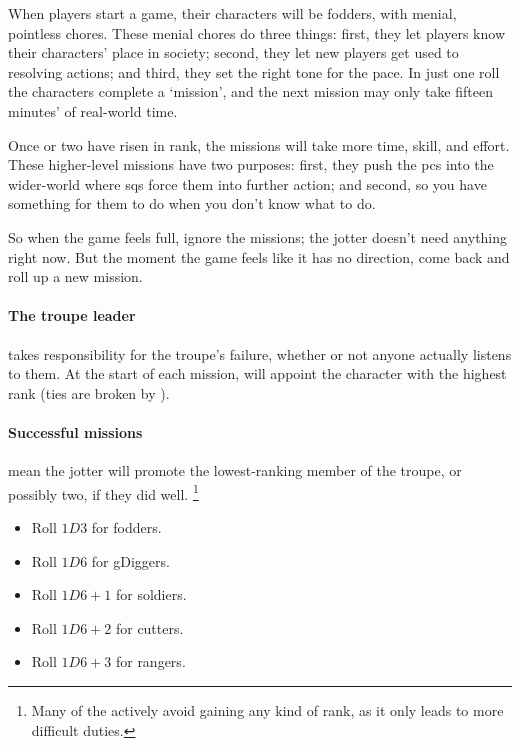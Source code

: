 \begin{multicols}{2}

\noindent
When players start a game, their characters will be \glspl{fodder}, with menial, pointless chores.
These menial chores do three things: first, they let players know their characters' place in society; second, they let new players get used to resolving actions; and third, they set the right tone for the pace.
In just one roll the characters complete a `mission', and the next mission may only take fifteen minutes' of real-world time.

Once  or two have risen in rank, the missions will take more time, skill, and effort.
These higher-level missions have two purposes: first, they push the \glspl{pc} into the wider-world where \glspl{sq} force them into further action; and second, so you have something for them to do when you don't know what to do.

So when the game feels full, ignore the missions; the \gls{jotter} doesn't need anything right now.
But the moment the game feels like it has no direction, come back and roll up a new mission.

\paragraph{The troupe leader}
takes responsibility for the troupe's failure, whether or not anyone actually listens to them.
At the start of each mission,  will appoint the character with the highest rank (ties are broken by ).

\paragraph{Successful missions}
mean the \gls{jotter} will promote the lowest-ranking member of the troupe, or possibly two, if they did well.%
\footnote{Many of the  actively avoid gaining any kind of rank, as it only leads to more difficult duties.}

\begin{itemize}
  \item
  Roll $1D3$ for \glspl{fodder}.
  \item
  Roll $1D6$ for \glspl{gDigger}.
  \item
  Roll $1D6+1$ for \glspl{soldier}.
  \item
  Roll $1D6+2$ for \glspl{cutter}.
  \item
  Roll $1D6+3$ for \glspl{ranger}.
\end{itemize}


\end{multicols}
